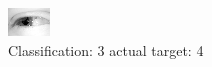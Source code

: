\begin{figure}[h!]
\begin{center}
\includegraphics[width=0.60\columnwidth]{figures/ID2529_class_3_target_4.png}
\end{center}
\caption{ Classification: 3 actual target: 4}
\label{fig:ID2529_class_3_target_4}
\end{figure}
